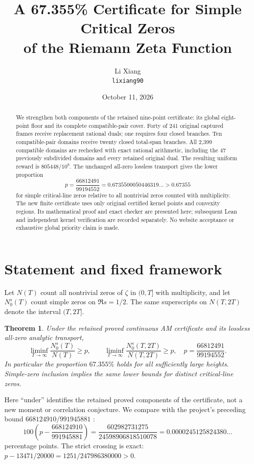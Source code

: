 \documentclass[11pt,a4paper]{article}
\title{A 67.355\% Certificate for Simple Critical Zeros\\
of the Riemann Zeta Function}
\author{Li Xiang\\\small\texttt{lixiang90}}
\date{October 11, 2026}
\newtheorem{theorem}{Theorem}[section]
\begin{document}
\maketitle
\begin{abstract}
We strengthen both components of the retained nine-point certificate:
its global eight-point floor and its complete compatible-pair cover.
Forty of 241 original captured frames receive replacement rational duals;
one requires four closed branches. Ten compatible-pair domains receive
twenty closed total-span branches. All 2,399 compatible domains are
rechecked with exact rational arithmetic, including the 47 previously
subdivided domains and every retained original dual. The resulting
uniform reward is $805448/10^8$. The unchanged all-zero lossless transport
gives the lower proportion
\[
 p=\frac{66812491}{99194552}=0.6735500050446319\ldots>0.67355
\]
for simple critical-line zeros relative to all nontrivial zeros counted
with multiplicity. The new finite certificate uses only original
certified kernel points and convexity regions. Its mathematical proof
and exact checker are presented here; subsequent Lean and independent
kernel verification are recorded separately. No website acceptance
or exhaustive global priority claim is made.
\end{abstract}

\section{Statement and fixed framework}

Let $N(T)$ count all nontrivial zeros of $\zeta$ in $(0,T]$ with
multiplicity, and let $N_0^s(T)$ count simple zeros on $\Re s=1/2$.
The same superscripts on $N(T,2T)$ denote the interval $(T,2T]$.

\begin{theorem}\label{thm:main}
Under the retained proved continuous AM certificate and its lossless
all-zero analytic transport,
\[
 \liminf_{T\to\infty}\frac{N_0^s(T)}{N(T)}\ge p,
 \qquad
 \liminf_{T\to\infty}\frac{N_0^s(T,2T)}{N(T,2T)}\ge p,
 \quad p=\frac{66812491}{99194552}.
\]
In particular the proportion $67.355\%$ holds for all sufficiently
large heights. Simple-zero inclusion implies the same lower bounds
for distinct critical-line zeros.
\end{theorem}

Here ``under'' identifies the retained proved components of the
certificate, not a new moment or correlation conjecture. We compare
with the project's preceding bound $668124910/991945881$ \cite{Low}:
\[
 100\left(p-\frac{668124910}{991945881}\right)
 =\frac{602982731275}{24598906818510078}
 =0.0000245125824380\ldots
\]
percentage points. The strict crossing is exact:
$p-13471/20000=1251/247986380000>0$.
\end{document}
